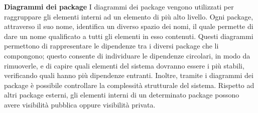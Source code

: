 						\textbf{Diagrammi dei package}
						\newline
						\newline
						I diagrammi dei package vengono utilizzati per raggruppare gli elementi interni ad un elemento di più alto livello. Ogni package, attraverso il suo nome, identifica un diverso spazio dei nomi, il quale permette di dare un nome qualificato a tutti gli elementi in esso contenuti.
						\newline
						Questi diagrammi permettono di rappresentare le dipendenze tra i diversi package che li compongono; questo consente di individuare le dipendenze circolari, in modo da rimuoverle, e di capire quali elementi del sistema dovranno essere i più stabili, verificando quali hanno più dipendenze entranti. Inoltre, tramite i diagrammi dei package è possibile controllare la complessità strutturale del sistema.
						\newline
						Rispetto ad altri package esterni, gli elementi interni di un determinato package possono avere visibilità pubblica oppure visibilità privata.
						
